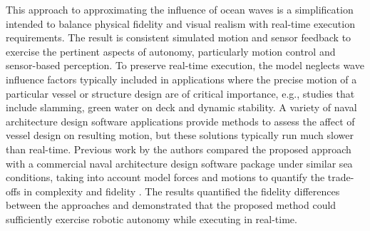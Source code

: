 \documentclass[utf8]{frontiersSCNS} %
\begin{document}
This approach to approximating the influence of ocean waves is a simplification intended to balance physical fidelity and visual realism with real-time execution requirements.  The result is consistent simulated motion and sensor feedback to exercise the pertinent aspects of autonomy, particularly motion control and sensor-based perception.  To preserve real-time execution, the model neglects wave influence factors typically included in applications where the precise motion of a particular vessel or structure design are of critical importance, e.g., studies that include slamming, green water on deck and dynamic stability.  A variety of naval architecture design software applications provide methods to assess the affect of vessel design on resulting motion, but these solutions typically run much slower than real-time.  Previous work by the authors  compared the proposed approach with a commercial naval architecture design software package under similar sea conditions, taking into account model forces and motions to quantify the trade-offs in complexity and fidelity \citep{malia18modeling}. The results quantified the fidelity differences between the approaches and demonstrated that the proposed method could sufficiently exercise robotic autonomy while executing in real-time.   

\end{document}
